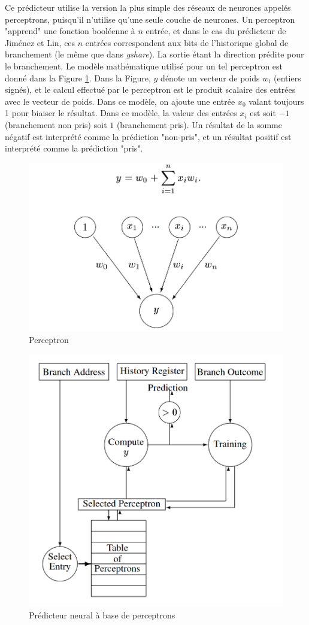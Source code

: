 \documentclass[a4paper]{article}
\begin{document}
Ce prédicteur utilise la version la plus simple des réseaux de neurones appelés perceptrons, puisqu'il n'utilise qu'une seule couche de neurones. Un perceptron "apprend" une fonction booléenne à $n$ entrée, et dans le cas du prédicteur de Jiménez et Lin, ces $n$ entrées correspondent aux bits de l'historique global de branchement (le même que dans \textit{gshare}). La sortie étant la direction prédite pour le branchement. Le modèle mathématique utilisé pour un tel perceptron est donné dans la Figure \ref{1perceptron}. Dans la Figure, $y$ dénote un vecteur de poids $w_i$ (entiers signés), et le calcul effectué par le perceptron est le produit scalaire des entrées avec le vecteur de poids. Dans ce modèle, on ajoute une entrée $x_0$ valant toujours 1 pour biaiser le résultat. Dans ce modèle, la valeur des entrées $x_i$ est soit $-1$ (branchement non pris) soit $1$ (branchement pris). Un résultat de la somme négatif est interprété comme la prédiction "non-pris", et un résultat positif est interprété comme la prédiction "pris".

\begin{figure}[hbt]\center\leavevmode
	\includegraphics[width=0.5\linewidth]{1perceptron}
	\caption{Perceptron}
	\label{1perceptron}
\end{figure}

      \begin{figure}[hbt]\center\leavevmode
	\includegraphics[width=0.5\linewidth]{perceptron}
	\caption{Prédicteur neural à base de perceptrons}
	\label{perceptron}
\end{figure}
\end{document}
